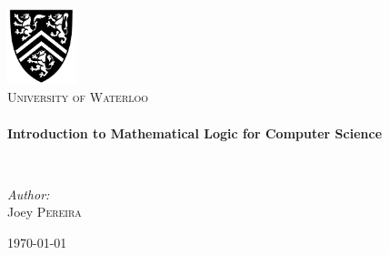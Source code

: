 \begin{titlepage}
\begin{center}


\includegraphics[width=0.15\textwidth]{./logo}~\\[1cm]

\textsc{\LARGE University of Waterloo}\\[1.5cm]


\HRule \\[0.4cm]
{ \huge \bfseries Introduction to Mathematical Logic for Computer Science \\[0.4cm] }

\HRule \\[1.5cm]

\begin{minipage}{0.4\textwidth}
\begin{flushleft} \large
\emph{Author:}\\
Joey \textsc{Pereira}
\end{flushleft}
\end{minipage}
\begin{minipage}{0.4\textwidth}
\begin{flushright} \large
\end{flushright}
\end{minipage}

\vfill

{\large \today}

\end{center}
\end{titlepage}